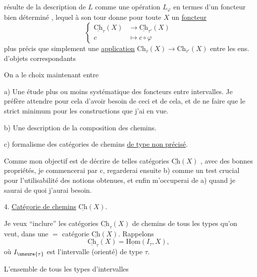  résulte de la description de $L$ comme une opération $L_\varphi$ en termes d'un foncteur bien déterminé
,
lequel à son tour donne pour toute $X$ un \uline{foncteur}
\[ \left\{\begin{aligned}
\underline{\mathrm{Ch}}_\tau(X)&\longrightarrow\underline{\mathrm{Ch}}_{\tau'}(X)\\
c&\longmapsto c\circ\varphi
\end{aligned}\right. \]
plus précis que simplement une \uline{application} $\mathrm{Ch}_\tau(X)\longrightarrow\mathrm{Ch}_{\tau'}(X)$ entre les ens. d'objets correspondants

On a le choix  maintenant entre

a) Une étude plus ou moins systématique des foncteurs entre intervalles. Je préfère attendre pour cela d'avoir besoin de ceci et de cela, et de ne faire que le strict minimum pour les constructions que j'ai en vue.

b) Une description de la composition des chemins.

c)  formalisme des catégories de chemins \uline{de type non précisé}.

Comme mon objectif est  de décrire de telles catégories $\underline{\mathrm{Ch}}(X)$ , avec des bonnes propriétés, je commencerai par c,  regarderai ensuite b) comme un test crucial pour l'utilisabilité des notions obtenues, et enfin m'occuperai de a) quand je saurai de quoi j'aurai  besoin.

4. \uline{Catégorie de chemins} $\underline{\mathrm{Ch}}(X)$.

Je veux ``inclure''  les catégories $\underline{\mathrm{Ch}}_\tau(X)$ de chemins de tous les types qu'on veut, dans une $=$ catégorie $\underline{\mathrm{Ch}}(X)$. Rappelons
\[ \underline{\mathrm{Ch}}_\tau(X)=\underline{\mathrm{Hom}}(I_\tau,X), \]
où $I_{\unsure{\tau}}$ est l'intervalle (orienté)  de type $\tau$. 

L'ensemble de tous les types d'intervalles

